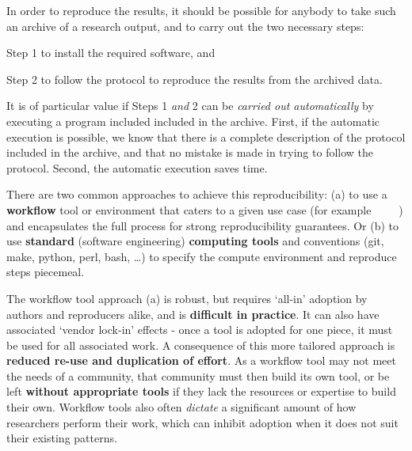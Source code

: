 In order to reproduce the results, it should be possible for anybody to take such an archive of a research
output, and to carry out the two necessary steps:
\begin{compactitem}
\item Step 1 to install the required software, and
\item Step 2 to follow the protocol to reproduce the results from the archived data.
\end{compactitem}

It is of particular value if Steps 1 \emph{and} 2 can be \emph{carried out
  automatically} by executing a program included included in the
archive. First, if the automatic execution is possible, we know that there is a
complete description of the protocol included in the archive, and that no
mistake is made in trying to follow the protocol. Second, the automatic
execution saves time.

There are two common approaches to achieve this reproducibility: (a) to use a
\textbf{workflow} tool or environment that caters to a given use case (for example
~\cite{reana2019} ~\cite{Afgan2018} ~\cite{Mlder2021})
and encapsulates the full process for strong reproducibility guarantees.
Or (b) to use \textbf{standard} (software engineering) \textbf{computing tools} and conventions
(git, make, python, perl, bash, \ldots)
to specify the compute environment and reproduce steps piecemeal.

The workflow tool approach (a) is robust, but requires `all-in' adoption by authors and reproducers alike,
and is \textbf{difficult in practice}. It can also have associated `vendor lock-in' effects
- once a tool is adopted for one piece, it must be used for all associated work.
A consequence of this more tailored approach is \textbf{reduced re-use and duplication of effort}.
As a workflow tool may not meet the needs of a community,
that community must then build its own tool, or be left \textbf{without appropriate tools}
if they lack the resources or expertise to build their own.
Workflow tools also often \emph{dictate} a significant amount of how researchers perform their work,
which can inhibit adoption when it does not suit their existing patterns.

